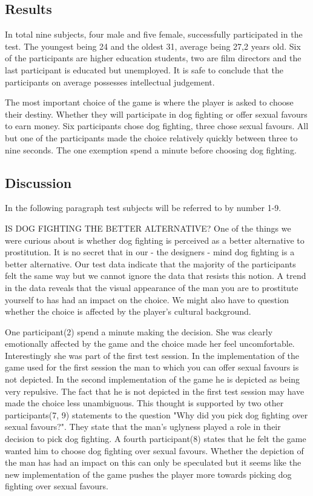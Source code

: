 \subsection{Results}
In total nine subjects, four male and five female, successfully participated in the test. The youngest being 24 and the oldest 31, average being 27,2 years old. Six of the participants are higher education students, two are film directors and the last participant is educated but unemployed. It is safe to conclude that the participants on average possesses intellectual judgement.

The most important choice of the game is where the player is asked to choose their destiny. Whether they will participate in dog fighting or offer sexual favours to earn money. Six participants chose dog fighting, three chose sexual favours. All but one of the participants made the choice relatively quickly between three to nine seconds. The one exemption spend a minute before choosing dog fighting.

\subsection{Discussion}
In the following paragraph test subjects will be referred to by number 1-9. 

IS DOG FIGHTING THE BETTER ALTERNATIVE?
One of the things we were curious about is whether dog fighting is perceived as a better alternative to prostitution. It is no secret that in our - the designers - mind dog fighting is a better alternative. Our test data indicate that the majority of the participants felt the same way but we cannot ignore the data that resists this notion. A trend in the data reveals that the visual appearance of the man you are to prostitute yourself to has had an impact on the choice. We might also have to question whether the choice is affected by the player's cultural background.

One participant(2) spend a minute making the decision. She was clearly emotionally affected by the game and the choice made her feel uncomfortable. Interestingly she was part of the first test session. In the implementation of the game used for the first session the man to which you can offer sexual favours is not depicted. In the second implementation of the game he is depicted as being very repulsive.   The fact that he is not depicted in the first test session may have made the choice less unambiguous. This thought is supported by two other participants(7, 9) statements to the question "Why did you pick dog fighting over sexual favours?". They state that the man's uglyness played a role in their decision to pick dog fighting. A fourth participant(8) states that he felt the game wanted him to choose dog fighting over sexual favours. Whether the depiction of the man has had an impact on this can only be speculated but it seems like the new implementation of the game pushes the player more towards picking dog fighting over sexual favours.

